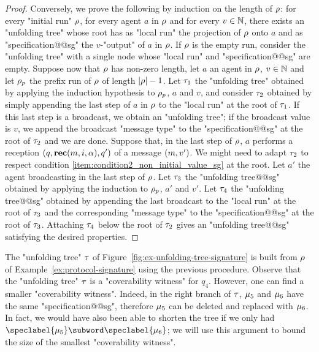 \begin{proof}
Conversely, we prove the following by induction on the length of $\rho$: for every "initial run" $\rho$, for every agent $a$ in $\rho$ and for every $v \in \mathbb{N}$, there exists an "unfolding tree" whose root has as "local run" the projection of $\rho$ onto $a$ and as "specification@@sg" the $v$-"output" of $a$ in $\rho$. If $\rho$ is the empty run, consider the "unfolding tree" with a single node whose "local run" and "specification@@sg" are empty. Suppose now that $\rho$ has non-zero length, let $a$ an agent in $\rho$, $v \in \mathbb{N}$ and let $\rho_p$ the prefix run of $\rho$ of length $|\rho|-1$.
Let $\tau_1$ the "unfolding tree" obtained by applying the induction hypothesis to $\rho_p$, $a$ and $v$, and consider $\tau_2$ obtained by simply appending the last step of $a$ in $\rho$ to the "local run" at the root of $\tau_1$. If this last step is a broadcast, we obtain an "unfolding tree"; if the broadcast value is $v$, we append the broadcast "message type" to the "specification@@sg" at the root of $\tau_2$ and we are done. 
Suppose that, in the last step of $\rho$, $a$ performs a reception $(q, \textbf{rec}(m, i, \alpha),q')$ of a message $(m,v')$. We might need to adapt $\tau_2$ to respect condition \ref{item:condition2_non_initial_value_sg} at the root. Let $a'$ the agent broadcasting in the last step of $\rho$. Let $\tau_3$ the "unfolding tree@@sg" obtained by applying the induction to $\rho_p$, $a'$ and $v'$. Let $\tau_4$ the "unfolding tree@@sg" obtained by appending the last broadcast to the "local run" at the root of $\tau_3$ and the corresponding "message type" to the "specification@@sg" at the root of $\tau_3$. Attaching $\tau_4$ below the root of $\tau_2$ gives an "unfolding tree@@sg" satisfying the desired properties. 
\end{proof}


	The "unfolding tree" $\tau$ of Figure~\ref{fig:ex-unfolding-tree-signature} is built from $\rho$ of Example~\ref{ex:protocol-signature} using the previous procedure. 
	 Observe that the "unfolding tree" $\tau$  is a "coverability witness" for $q_4$. However, one can find a smaller "coverability witness". 
	Indeed, in the right branch of $\tau$, $\mu_5$ and $\mu_6$ have the same "specification@@sg", therefore $\mu_5$ can be deleted and replaced with $\mu_6$. In fact, we would have also been able to shorten the tree if we only had $\speclabel{\node_5} \subword \speclabel{\node_6}$; we will use this argument to bound the size of the smallest "coverability witness".   

